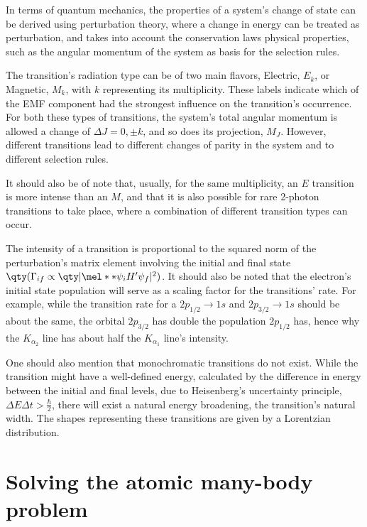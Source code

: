 In terms of quantum mechanics, the properties of a system's change of state can be derived using perturbation theory, where a change in energy can be treated as perturbation, and takes into account the conservation laws physical properties, such as the angular momentum of the system as basis for the selection rules.

The transition's radiation type can be of two main flavors, Electric, $E_k$, or Magnetic, $M_k$, with $k$ representing its multiplicity. These labels indicate which of the \gls{EMF} component had the strongest influence on the transition's occurrence.
For both these types of transitions, the system's total angular momentum is allowed a change of $\Delta J = 0, \pm k$, and so does its projection, $M_J$. However, different transitions lead to different changes of parity in the system and to different selection rules.

It should also be of note that, usually, for the same multiplicity, an $E$ transition is more intense than an $M$, and that it is also possible for rare 2-photon transitions to take place, where a combination of different transition types can occur.



The intensity of a transition is proportional to the squared norm of the perturbation's matrix element involving the initial and final state $\qty(\Gamma_{if}\propto \qty|\mel**{\psi_i}{H'}{\psi_f}|^2)$. It should also be noted that the electron's initial state population will serve as a scaling factor for the transitions' rate.
For example, while the transition rate for a $2p_{1/2}\rightarrow1s$ and $2p_{3/2}\rightarrow1s$ should be about the same, the orbital $2p_{3/2}$ has double the population $2p_{1/2}$ has, hence why the $K_{\alpha_2}$ line has about half the $K_{\alpha_1}$ line's intensity.

One should also mention that monochromatic transitions do not exist. While the transition might have a well-defined energy, calculated by the difference in energy between the initial and final levels, due to Heisenberg's uncertainty principle, $\Delta E \Delta t > \frac{\hbar}{2}$, there will exist a natural energy broadening, the transition's natural width. The shapes representing these transitions are given by a Lorentzian distribution.




\section{Solving the atomic many-body problem}

